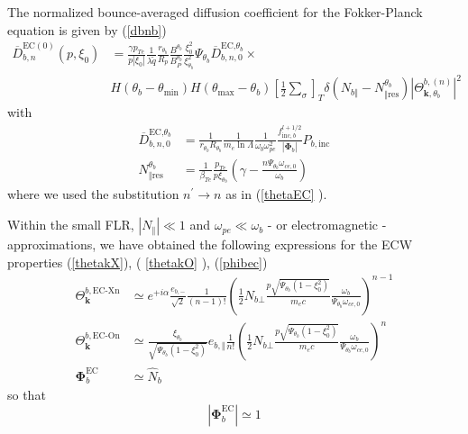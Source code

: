 The normalized bounce-averaged diffusion coefficient for the Fokker-Planck
equation is given by (\ref{dbnb})%
\begin{align}
\overline{D}_{b,n}^{\text{EC}(0)}(p,\xi_{0}) &  =\frac{\gamma p_{Te}}{p\left|
\xi_{0}\right|  }\frac{1}{\lambda\widetilde{q}}\frac{r_{\theta_{b}}}{R_{p}%
}\frac{B^{\theta_{b}}}{B_{P}^{\theta_{b}}}\frac{\xi_{0}^{2}}{\xi_{\theta_{b}%
}^{2}}\Psi_{\theta_{b}}\overline{D}_{b,n,0}^{\text{EC,}\theta_{b}}%
\times\nonumber\\
&  H\left(  \theta_{b}-\theta_{\min}\right)  H\left(  \theta_{\max}-\theta
_{b}\right)  \left[  \frac{1}{2}\sum\limits_{\sigma}\right]  _{T}\delta\left(
N_{b\Vert}-N_{\Vert\text{res}}^{\theta_{b}}\right)  \left|  \Theta
_{\mathbf{k,}\theta_{b}}^{b,\left(  n\right)  }\right|  ^{2}\label{dec}%
\end{align}
with
\begin{align}
\overline{D}_{b,n,0}^{\text{EC,}\theta_{b}} &  =\frac{1}{r_{\theta_{b}%
}R_{\theta_{b}}}\frac{1}{m_{e}\ln\Lambda}\frac{1}{\omega_{b}\omega_{pe}^{2}%
}\frac{f_{\text{inc},b}^{l+1/2}}{\left|  \mathbf{\Phi}_{b}\right|
}P_{b,\text{inc}}\\
N_{\Vert\text{res}}^{\theta_{b}} &  =\frac{1}{\beta_{Te}}\frac{p_{Te}}%
{p\xi_{\theta_{b}}}\left(  \gamma-\frac{n\Psi_{\theta_{b}}\omega_{ce,0}%
}{\omega_{b}}\right)
\end{align}
where we used the substitution $n^{\prime}\rightarrow n$ as in (\ref{thetaEC}%
).

Within the small FLR, $\left|  N_{\Vert}\right|  \ll1$ and $\omega_{pe}%
\ll\omega_{b}$ - or electromagnetic - approximations, we have obtained the
following expressions for the ECW properties (\ref{thetakX}), ( \ref{thetakO}%
), (\ref{phibec})
\begin{align}
\Theta_{\mathbf{k}}^{b,\text{EC-Xn}} &  \simeq e^{+i\alpha}\frac{e_{b,-}%
}{\sqrt{2}}\frac{1}{\left(  n-1\right)  !}\left(  \frac{1}{2}N_{b\bot}%
\frac{p\sqrt{\Psi_{\theta_{b}}\left(  1-\xi_{0}^{2}\right)  }}{m_{e}c}%
\frac{\omega_{b}}{\Psi_{\theta_{b}}\omega_{ce,0}}\right)  ^{n-1}\\
\Theta_{\mathbf{k}}^{b,\text{EC-On}} &  \simeq\frac{\xi_{\theta_{b}}}%
{\sqrt{\Psi_{\theta_{b}}\left(  1-\xi_{0}^{2}\right)  }}e_{b,\Vert}\frac
{1}{n!}\left(  \frac{1}{2}N_{b\bot}\frac{p\sqrt{\Psi_{\theta_{b}}\left(
1-\xi_{0}^{2}\right)  }}{m_{e}c}\frac{\omega_{b}}{\Psi_{\theta_{b}}%
\omega_{ce,0}}\right)  ^{n}\\
\mathbf{\Phi}_{b}^{\text{EC}} &  \simeq\widehat{N}_{b}%
\end{align}
so that%
\[
\left|  \mathbf{\Phi}_{b}^{\text{EC}}\right|  \simeq1
\]

